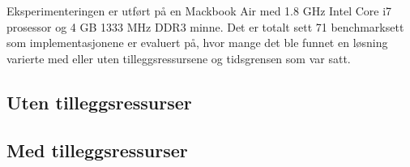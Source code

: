 Eksperimenteringen er utført på en Mackbook Air med 1.8 GHz Intel Core i7 prosessor og 4 GB 1333 MHz DDR3 minne. Det er totalt sett 71 benchmarksett som implementasjonene er evaluert på, hvor mange det ble funnet en løsning varierte med eller uten tilleggsressursene og tidsgrensen som var satt.

\subsection{Uten tilleggsressurser}


\subsection{Med tilleggsressurser}
